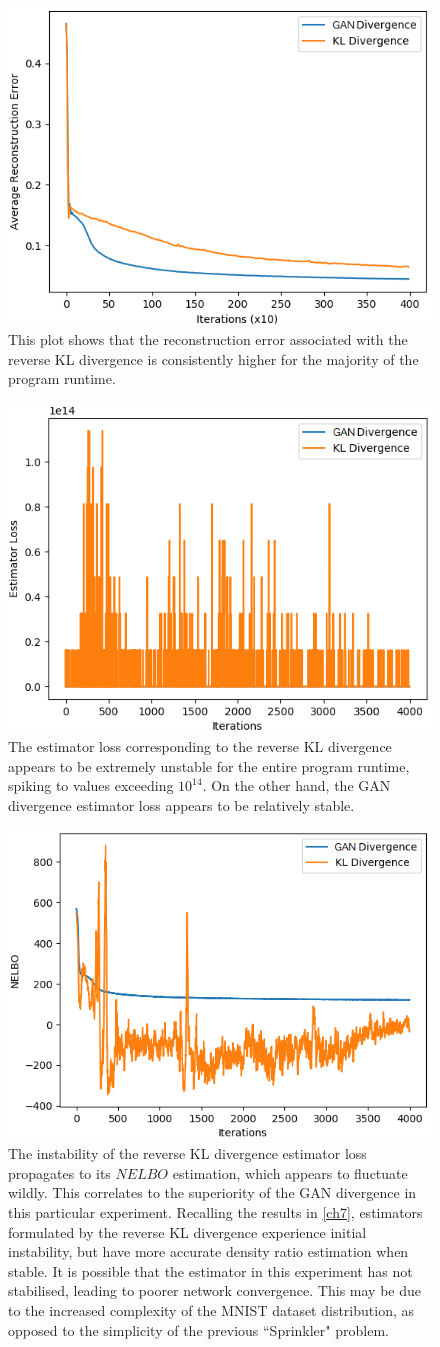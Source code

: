 \documentclass[honours,12pt]{unswthesis}
\numberwithin{equation}{section}
\theoremstyle{definition}
\begin{document}
\begin{figure}[h]
\centering
\includegraphics[width=0.49\linewidth]{part4reconerrors/PCADVvsPCKLD.png}
\caption{\small This plot shows that the reconstruction error associated with the reverse KL divergence is consistently higher for the majority of the program runtime.}
\end{figure}
\begin{figure}[h]
\centering
\includegraphics[width=0.49\linewidth]{part4estimatorlosses/PCADVvsPCKLD.png}
\caption{\small The estimator loss corresponding to the reverse KL divergence appears to be extremely unstable for the entire program runtime, spiking to values exceeding $10^{14}$. On the other hand, the GAN divergence estimator loss appears to be relatively stable.}
\end{figure}
\begin{figure}[h]
\centering
\includegraphics[width=0.49\linewidth]{part4nelbos/PCADVvsPCKLD.png}
\caption{\small The instability of the reverse KL divergence estimator loss propagates to its $NELBO$ estimation, which appears to fluctuate wildly. This correlates to the superiority of the GAN divergence in this particular experiment. Recalling the results in \autoref{ch7}, estimators formulated by the reverse KL divergence experience initial instability, but have more accurate density ratio estimation when stable. It is possible that the estimator in this experiment has not stabilised, leading to poorer network convergence. This may be due to the increased complexity of the MNIST dataset distribution, as opposed to the simplicity of the previous ``Sprinkler" problem.}
\end{figure}
\end{document}

